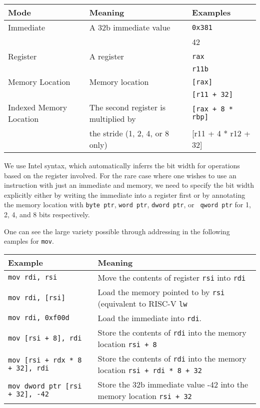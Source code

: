\begin{tabular}{l|l|l} \hline
  Mode & Meaning & Examples \\ \hline
  Immediate & A 32b immediate value & \tt 0x381 \\
  & & 42 \\ \hline
  Register & A register  & \tt rax \\
  & & \tt r11b \\ \hline
  Memory Location & Memory location & \tt [rax] \\
  & & \tt [r11 + 32] \\ \hline
  Indexed Memory Location & The second register is multiplied by & \tt [rax + 8 * rbp] \\
  & the stride (1, 2, 4, or 8 only) & [r11 + 4 * r12 + 32] \\ \hline
  
  \end{tabular}

\vspace{0.2in} We use Intel syntax, which automatically inferrs the
bit width for operations based on the register involved.  For the rare
case where one wishes to use an instruction with just an immediate and
memory, we need to specify the bit width explicitly either by writing
the immediate into a register first or by annotating the memory
location with {\tt byte ptr}, {\tt word ptr}, {\tt dword ptr}, or {\tt
  qword ptr} for 1, 2, 4, and 8 bits respectively.

One can see the large variety possible through addressing in the following eamples for {\tt mov}.

\vspace{0.2in}

\begin{tabular}{l|l}
  Example & Meaning \\ \hline
  \tt mov rdi, rsi & Move the contents of register {\tt rsi} into {\tt rdi} \\
  \tt mov rdi, [rsi] & Load the memory pointed to by {\tt rsi} (equivalent to RISC-V {\tt lw} \\ 
  \tt mov rdi, 0xf00d & Load the immediate into {\tt rdi}.  \\
  \tt mov [rsi + 8], rdi & Store the contents of {\tt rdi} into the memory location {\tt rsi + 8} \\
  \tt mov [rsi + rdx * 8 + 32], rdi & Store the contents of {\tt rdi} into the memory location {\tt rsi + rdi * 8 + 32} \\
  \tt mov dword ptr [rsi + 32], -42 & Store the 32b immediate value -42 into the memory location {\tt rsi + 32} \\
  
  \end{tabular}

